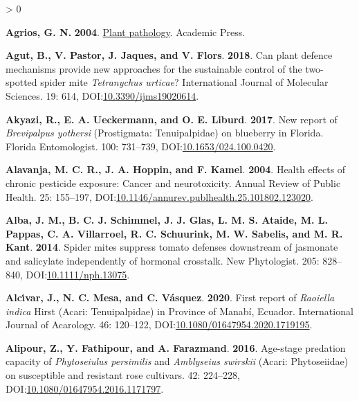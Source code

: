 \documentclass{ufdissertation}[overrideChapters] %
\newlength{\cslhangindent}
\newenvironment{CSLReferences}[2] %
 {%
  \setlength{\parindent}{0pt}
  \ifodd #1 \everypar{\setlength{\hangindent}{\cslhangindent}}\ignorespaces\fi
  \ifnum #2 > 0
  \setlength{\parskip}{#2\baselineskip}
  \fi
 }%
 {}
\begin{document}
{\begin{CSLReferences}{1}{1}
\leavevmode{}%
\textbf{Agrios, G. N.} \textbf{2004}. \href{https://www.ebook.de/de/product/3267675/george_n_agrios_plant_pathology.html}{Plant pathology}. Academic Press.

\leavevmode{}%
\textbf{Agut, B., V. Pastor, J. Jaques, and V. Flors}. \textbf{2018}. Can plant defence mechanisms provide new approaches for the sustainable control of the two-spotted spider mite {\emph{Tetranychus urticae}}? International Journal of Molecular Sciences. 19: 614, DOI:\href{https://doi.org/10.3390/ijms19020614}{10.3390/ijms19020614}.

\leavevmode{}%
\textbf{Akyazi, R., E. A. Ueckermann, and O. E. Liburd}. \textbf{2017}. New report of {\emph{Brevipalpus yothersi}} ({Prostigmata}: {Tenuipalpidae}) on blueberry in {Florida}. Florida Entomologist. 100: 731--739, DOI:\href{https://doi.org/10.1653/024.100.0420}{10.1653/024.100.0420}.

\leavevmode{}%
\textbf{Alavanja, M. C. R., J. A. Hoppin, and F. Kamel}. \textbf{2004}. Health effects of chronic pesticide exposure: Cancer and neurotoxicity. Annual Review of Public Health. 25: 155--197, DOI:\href{https://doi.org/10.1146/annurev.publhealth.25.101802.123020}{10.1146/annurev.publhealth.25.101802.123020}.

\leavevmode{}%
\textbf{Alba, J. M., B. C. J. Schimmel, J. J. Glas, L. M. S. Ataide, M. L. Pappas, C. A. Villarroel, R. C. Schuurink, M. W. Sabelis, and M. R. Kant}. \textbf{2014}. Spider mites suppress tomato defenses downstream of jasmonate and salicylate independently of hormonal crosstalk. New Phytologist. 205: 828--840, DOI:\href{https://doi.org/10.1111/nph.13075}{10.1111/nph.13075}.

\leavevmode{}%
\textbf{Alcı́var, J., N. C. Mesa, and C. Vásquez}. \textbf{2020}. First report of {\emph{Raoiella indica}} {Hirst} ({Acari}: {Tenuipalpidae}) in {Province} of {Manab{í}}, {Ecuador}. International Journal of Acarology. 46: 120--122, DOI:\href{https://doi.org/10.1080/01647954.2020.1719195}{10.1080/01647954.2020.1719195}.

\leavevmode{}%
\textbf{Alipour, Z., Y. Fathipour, and A. Farazmand}. \textbf{2016}. Age-stage predation capacity of {\emph{Phytoseiulus persimilis}} and {\emph{Amblyseius swirskii}} ({Acari}: {Phytoseiidae}) on susceptible and resistant rose cultivars. 42: 224--228, DOI:\href{https://doi.org/10.1080/01647954.2016.1171797}{10.1080/01647954.2016.1171797}.


\end{CSLReferences}}
\end{document}
